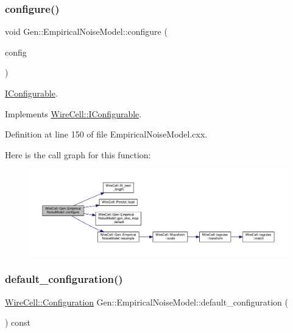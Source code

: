 \subsubsection{\texorpdfstring{configure()}{configure()}}
{\footnotesize\ttfamily void Gen\+::\+Empirical\+Noise\+Model\+::configure (\begin{DoxyParamCaption}\item[{const \hyperlink{namespace_wire_cell_a9f705541fc1d46c608b3d32c182333ee}{Wire\+Cell\+::\+Configuration} \&}]{config }\end{DoxyParamCaption})\hspace{0.3cm}{\ttfamily [virtual]}}



\hyperlink{class_wire_cell_1_1_i_configurable}{I\+Configurable}. 



Implements \hyperlink{class_wire_cell_1_1_i_configurable_a57ff687923a724093df3de59c6ff237d}{Wire\+Cell\+::\+I\+Configurable}.



Definition at line 150 of file Empirical\+Noise\+Model.\+cxx.

Here is the call graph for this function\+:
\nopagebreak
\begin{figure}[H]
\begin{center}
\leavevmode
\includegraphics[width=350pt]{class_wire_cell_1_1_gen_1_1_empirical_noise_model_aa38f65fc1f32c8017f8205b32850074e_cgraph}
\end{center}
\end{figure}
\mbox{\label{class_wire_cell_1_1_gen_1_1_empirical_noise_model_a683bdf03c14c78ff74b12a844a688c61}} 
\subsubsection{\texorpdfstring{default\+\_\+configuration()}{default\_configuration()}}
{\footnotesize\ttfamily \hyperlink{namespace_wire_cell_a9f705541fc1d46c608b3d32c182333ee}{Wire\+Cell\+::\+Configuration} Gen\+::\+Empirical\+Noise\+Model\+::default\+\_\+configuration (\begin{DoxyParamCaption}{ }\end{DoxyParamCaption}) const\hspace{0.3cm}{\ttfamily [virtual]}}




